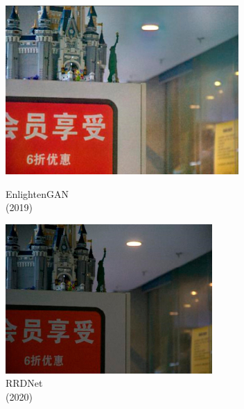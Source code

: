 \documentclass[CJK,aspectratio=169]{beamer}  %
\begin{document}
\begin{frame}
\begin{figure}
\begin{minipage}{.58\columnwidth}
				\begin{minipage}{0.17\columnwidth}
					\includegraphics[width=\linewidth]{picture/LLIE/VE-LOL-L/EnlightenGAN}
					\caption*{\tiny EnlightenGAN \\ (2019)}
					\label{fig: EnlightenGAN}	
				\end{minipage}
				\begin{minipage}{0.17\columnwidth}
					\includegraphics[width=\linewidth]{picture/LLIE/VE-LOL-L/RRDNet}
					\caption*{\tiny RRDNet \\ (2020)}
					\label{fig: RRDNet}	
				\end{minipage}
				\begin{minipage}{0.17\columnwidth}

\end{minipage}
\end{minipage}
\end{figure}
\end{frame}
\end{document}

